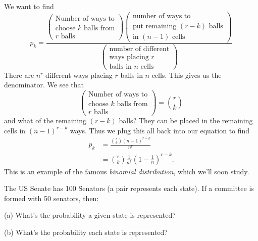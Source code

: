 We want to find
\begin{equation}
p_{k} = \frac{\begin{pmatrix}
    \mbox{Number of ways to}\\
    \mbox{choose $k$ balls from}\\
    \mbox{$r$ balls}
  \end{pmatrix}
\begin{pmatrix}
  \mbox{number of ways to}\\
  \mbox{put remaining $(r-k)$ balls}\\
  \mbox{in $(n-1)$ cells}
\end{pmatrix}}{\begin{pmatrix}\mbox{number of different}\\
\mbox{ways placing $r$}\\
\mbox{balls in $n$ cells}
  \end{pmatrix}}
\end{equation}
There are $n^{r}$ different ways placing $r$ balls in $n$ cells. This
gives us the denominator. We see that
\begin{equation}
\begin{pmatrix}
    \mbox{Number of ways to}\\
    \mbox{choose $k$ balls from}\\
    \mbox{$r$ balls}
  \end{pmatrix} = \binom{r}{k}
\end{equation}
and what of the remaining $(r-k)$ balls? They can be placed in the
remaining cells in $(n-1)^{r-k}$ ways. Thus we plug this all back into
our equation to find
\begin{equation}
\begin{split}
p_{k}&=\frac{\displaystyle\binom{r}{k}(n-1)^{r-k}}{n^{r}}\\
&=\binom{r}{k}\frac{1}{n^{k}}\left(1-\frac{1}{n}\right)^{r-k}.
\end{split}
\end{equation}
This is an example of the famous \emph{binomial distribution}, which
we'll soon study.

The US Senate has 100 Senators (a pair represents each state). If a
committee is formed with 50 senators, then:

(a) What's the probability a given state is represented?

(b) What's the probability each state is represented?


